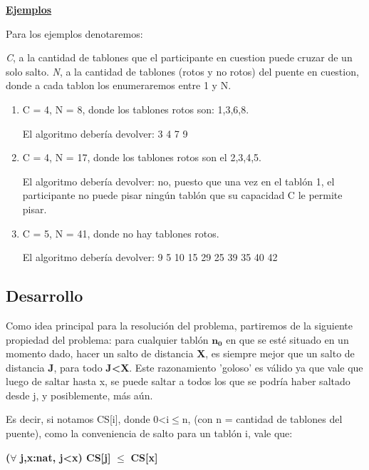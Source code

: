 \noindent \underline{\textbf{Ejemplos}}

\noindent Para los ejemplos denotaremos:

\textit{C}, a la cantidad de tablones que el participante en cuestion puede cruzar de un solo salto.\newline
\indent \textit{N}, a la cantidad de tablones (rotos y no rotos) del puente en cuestion, donde a cada tablon los enumeraremos entre 1 y N.

\begin{enumerate}[leftmargin=0.5cm]

\item C = 4, N = 8, donde los tablones rotos son: 1,3,6,8.

El algoritmo debería devolver: 3 4 7 9

\item C = 4, N = 17, donde los tablones rotos son el 2,3,4,5.

El algoritmo debería devolver: no, puesto que una vez en el tablón 1, el participante no puede pisar ningún tablón que su capacidad C le permite pisar.

\item  C = 5, N = 41, donde no hay tablones rotos.
                         
El algoritmo debería devolver: 9 5 10 15 29 25 39 35 40 42

\end{enumerate}
\newpage

\subsection{Desarrollo}

Como idea principal para la resolución del problema, partiremos de la siguiente propiedad del problema:
para cualquier tablón $\boldsymbol{n_0}$ en que se esté situado en un momento dado, hacer un salto de distancia \textbf{X}, es siempre mejor que un salto de distancia \textbf{J}, para todo \textbf{J\textless X}. Este razonamiento 'goloso' es válido ya que vale que luego de saltar hasta x, se puede saltar a todos los que se podría haber saltado desde j, y posiblemente, más aún.

Es decir, si notamos CS[i], donde 0\textless i$\leq$n, (con n = cantidad de tablones del puente), como la conveniencia de salto para un tablón i, vale que:

\textbf{(}$\boldsymbol\forall$ \textbf{j,x:nat, j\textless x) CS[j]} $\boldsymbol\leq$ \textbf{CS[x]}

